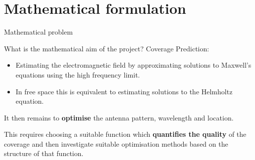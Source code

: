 \documentclass[8pt]{beamer}
\begin{document}
\section{Mathematical formulation}
\begin{frame}{Mathematical problem}
\begin{block}{What is the mathematical aim of the project?}
Coverage Prediction:
\begin{itemize}
\item Estimating the electromagnetic field by approximating solutions to Maxwell's equations using the high frequency limit.
\item In free space %
 this is equivalent to estimating solutions to the Helmholtz equation.
\end{itemize}
It then remains to \textbf{optimise} the antenna pattern, wavelength and location. 
\par This requires choosing a suitable function which \textbf{quantifies the quality} of the coverage and then investigate suitable optimisation methods based on the structure of that function.
\end{block}
\end{frame}
\end{document}
